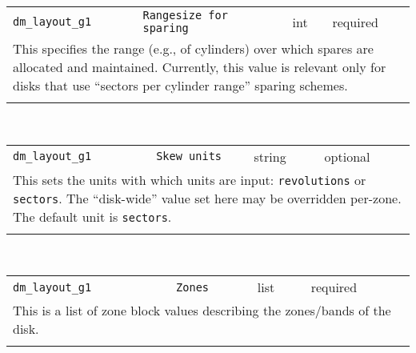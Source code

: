 \noindent 
\begin{tabular}{|p{1.5in}|p{3.5in}|p{0.5in}|p{0.5in}|}
\cline{1-4}
\texttt{dm\_layout\_g1} & \texttt{Rangesize for sparing} & int & required \\ 
\cline{1-4}
\multicolumn{4}{|p{6in}|}{
This specifies the range (e.g., of cylinders) over which spares are
allocated and maintained. Currently, this value is relevant only for
disks that use ``sectors per cylinder range'' sparing schemes.
}\\ 
\cline{1-4}
\multicolumn{4}{p{5in}}{}\\
\end{tabular}\\ 
\noindent 
\begin{tabular}{|p{1.5in}|p{3.5in}|p{0.5in}|p{0.5in}|}
\cline{1-4}
\texttt{dm\_layout\_g1} & \texttt{Skew units} & string & optional \\ 
\cline{1-4}
\multicolumn{4}{|p{6in}|}{
This sets the units with which units are input: \texttt{revolutions} or
\texttt{sectors}. The ``disk-wide'' value set here may be overridden
per-zone. The default unit is \texttt{sectors}.
}\\ 
\cline{1-4}
\multicolumn{4}{p{5in}}{}\\
\end{tabular}\\ 
\noindent 
\begin{tabular}{|p{1.5in}|p{3.5in}|p{0.5in}|p{0.5in}|}
\cline{1-4}
\texttt{dm\_layout\_g1} & \texttt{Zones} & list & required \\ 
\cline{1-4}
\multicolumn{4}{|p{6in}|}{
This is a list of zone block values describing the zones/bands of the disk.
}\\ 
\cline{1-4}
\multicolumn{4}{p{5in}}{}\\
\end{tabular}\\ 
